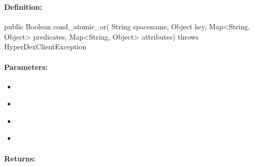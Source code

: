 \subsubsection{}
\label{api:java:cond_atomic_or}


\paragraph{Definition:}
\begin{javacode}
public Boolean cond_atomic_or(
        String spacename,
        Object key,
        Map<String, Object> predicates,
        Map<String, Object> attributes) throws HyperDexClientException
\end{javacode}

\paragraph{Parameters:}
\begin{itemize}[noitemsep]
\item {}\\

\item {}\\

\item {}\\

\item {}\\

\end{itemize}

\paragraph{Returns:}


\pagebreak
\subsubsection{}
\label{api:java:async_cond_atomic_or}


